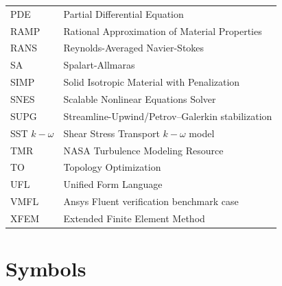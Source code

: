 \documentclass[master=ewtk,masteroption=,openany]{kulemt}
\begin{document}
\begin{flushleft}
\begin{tabularx}{\textwidth}{@{}p{35mm}X@{}}
		PDE & Partial Differential Equation \\
		RAMP & Rational Approximation of Material Properties \\
		RANS & Reynolds-Averaged Navier-Stokes \\
			SA  & Spalart-Allmaras \\
			SIMP & Solid Isotropic Material with Penalization \\
			SNES & Scalable Nonlinear Equations Solver \\
			SUPG & Streamline-Upwind/Petrov--Galerkin stabilization \\
			SST $k-\omega$ & Shear Stress Transport $k-\omega$ model \\
			TMR & NASA Turbulence Modeling Resource \\
			TO  & Topology Optimization \\
			UFL & Unified Form Language \\
			VMFL & Ansys Fluent verification benchmark case \\
		XFEM & Extended Finite Element Method \\
	\end{tabularx}
\end{flushleft}

\section*{Symbols}
\end{document}
